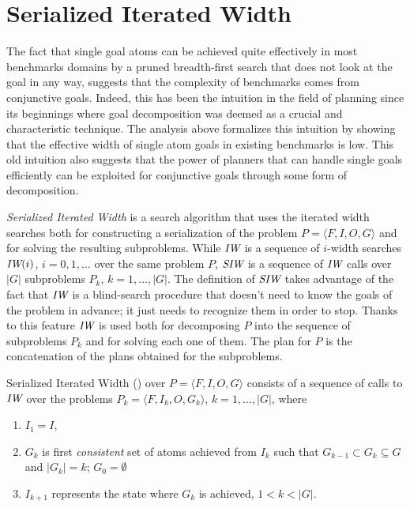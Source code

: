 \documentclass[letterpaper]{article}
\begin{document}
{  %
  \section{Serialized Iterated Width}


  The fact that single goal atoms can be achieved quite effectively in
  most benchmarks domains by a pruned breadth-first search that does not
  look at the goal in any way, suggests that the complexity of
  benchmarks comes from conjunctive goals. Indeed, this has been the
  intuition in the field of planning since its beginnings where goal
  decomposition was deemed as a crucial and characteristic
  technique. The analysis above formalizes this intuition by showing
  that the effective width of single atom goals in existing benchmarks
  is low.  This old intuition also suggests that the power of planners
  that can handle single goals efficiently can be exploited for
  conjunctive goals through some form of decomposition.


  \emph{Serialized Iterated Width} is a search algorithm that uses the
  iterated width searches both for constructing a serialization of the
  problem $P = \langle F,I,O,G\rangle$ and for solving the resulting
  subproblems. While ${\textit{IW}}$ is a sequence of $i$-width searches ${\textit{IW}}(i)$,
  $i=0,1,\ldots$ over the same problem $P$, ${\textit{SIW}}$ is a sequence of ${\textit{IW}}$
  calls over $|G|$ subproblems $P_k$, $k=1, \ldots, |G|$.  The
  definition of ${\textit{SIW}}$ takes advantage of the fact that ${\textit{IW}}$ is a
  blind-search procedure that doesn't need to know the goals of the
  problem in advance; it just needs to recognize them in order to stop.
  Thanks to this feature ${\textit{IW}}$ is used both for decomposing $P$ into the
  sequence of subproblems $P_k$ and for solving each one of them. The
  plan for $P$ is the concatenation of the plans obtained for the
  subproblems.

  \begin{definition}
    Serialized Iterated Width (\SR) over $P=\langle F,I,O,G\rangle$
    consists of a sequence of calls to ${\textit{IW}}$ over the problems $P_k
    =\langle F,I_k,O,G_k\rangle$, $k=1, \ldots, |G|$, where

    \begin{enumerate}
    \item $I_1=I$,
    \item $G_{k}$ is first \emph{consistent}  set of atoms  achieved from $I_k$
      such that $G_{k-1} \subset G_k \subseteq G$ and $|G_k|=k$; $G_0 = \emptyset$
    \item $I_{k+1}$ represents the   state where  $G_k$ is  achieved, $1 < k < |G|$.
    \end{enumerate}
  \end{definition}


}
\end{document}
